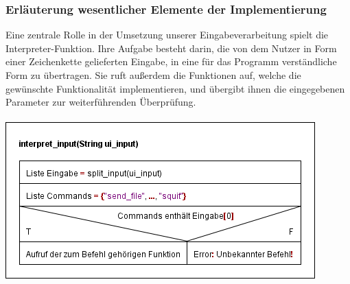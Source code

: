 \subsubsection{Erläuterung wesentlicher Elemente der Implementierung}
Eine zentrale Rolle in der Umsetzung unserer Eingabeverarbeitung spielt die Interpreter-Funktion. Ihre Aufgabe besteht darin, die von dem Nutzer in Form einer Zeichenkette gelieferten Eingabe, in eine für das Programm verständliche Form zu übertragen. Sie ruft außerdem die Funktionen auf, welche die gewünschte Funktionalität implementieren, und übergibt ihnen die eingegebenen Parameter zur weiterführenden Überprüfung.\\\hfill\\
\includegraphics[scale=0.75]{templ}\\
